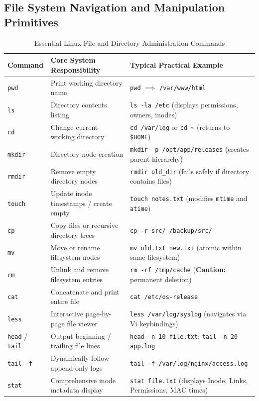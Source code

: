 \subsection{File System Navigation and Manipulation Primitives}
\begin{table}[htbp]
\centering
\small
\caption{Essential Linux File and Directory Administration Commands}
\label{tab:linux_file_commands}
\begin{tabularx}{\textwidth}{l p{4.2cm} X}
\toprule
\textbf{Command} & \textbf{Core System Responsibility} & \textbf{Typical Practical Example} \\
\midrule
\texttt{pwd} & Print working directory name & \texttt{pwd} $\implies$ \texttt{/var/www/html} \\
\texttt{ls} & Directory contents listing & \texttt{ls -la /etc} (displays permissions, owners, inodes) \\
\texttt{cd} & Change current working directory & \texttt{cd /var/log} or \texttt{cd \~{}} (returns to \texttt{\$HOME}) \\
\texttt{mkdir} & Directory node creation & \texttt{mkdir -p /opt/app/releases} (creates parent hierarchy) \\
\texttt{rmdir} & Remove empty directory nodes & \texttt{rmdir old\_dir} (fails safely if directory contains files) \\
\texttt{touch} & Update inode timestamps / create empty & \texttt{touch notes.txt} (modifies \texttt{mtime} and \texttt{atime}) \\
\texttt{cp} & Copy files or recursive directory trees & \texttt{cp -r src/ /backup/src/} \\
\texttt{mv} & Move or rename filesystem nodes & \texttt{mv old.txt new.txt} (atomic within same filesystem) \\
\texttt{rm} & Unlink and remove filesystem entries & \texttt{rm -rf /tmp/cache} (\textbf{Caution:} permanent deletion) \\
\texttt{cat} & Concatenate and print entire file & \texttt{cat /etc/os-release} \\
\texttt{less} & Interactive page-by-page file viewer & \texttt{less /var/log/syslog} (navigates via Vi keybindings) \\
\texttt{head} / \texttt{tail} & Output beginning / trailing file lines & \texttt{head -n 10 file.txt}; \texttt{tail -n 20 app.log} \\
\texttt{tail -f} & Dynamically follow append-only logs & \texttt{tail -f /var/log/nginx/access.log} \\
\texttt{stat} & Comprehensive inode metadata display & \texttt{stat file.txt} (displays Inode, Links, Permissions, MAC times) \\
\bottomrule
\end{tabularx}
\end{table}

